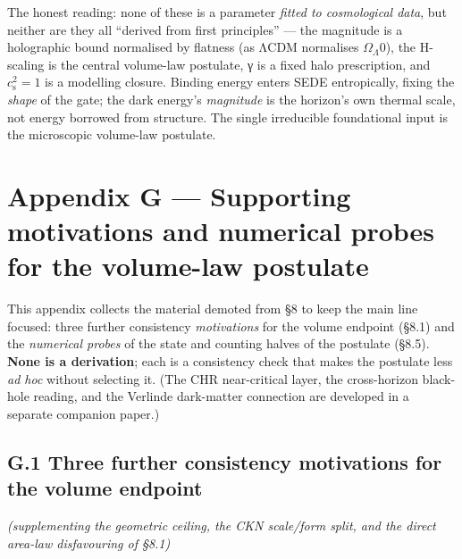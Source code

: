 \documentclass[
  10pt,
]{article}
\begin{document}
The honest reading: none of these is a parameter \emph{fitted to
cosmological data}, but neither are they all ``derived from first
principles'' --- the magnitude is a holographic bound normalised by
flatness (as ΛCDM normalises \(\Omega _\Lambda 0\)), the H-scaling is
the central volume-law postulate, γ is a fixed halo prescription, and
\(c_{\mathrm{s}}^{2} = 1\) is a modelling closure. Binding energy enters
SEDE entropically, fixing the \emph{shape} of the gate; the dark
energy's \emph{magnitude} is the horizon's own thermal scale, not energy
borrowed from structure. The single irreducible foundational input is
the microscopic volume-law postulate.

\section{Appendix G --- Supporting motivations and numerical probes for
the volume-law
postulate}\label{appendix-g-supporting-motivations-and-numerical-probes-for-the-volume-law-postulate}

This appendix collects the material demoted from §8 to keep the main
line focused: three further consistency \emph{motivations} for the
volume endpoint (§8.1) and the \emph{numerical probes} of the state and
counting halves of the postulate (§8.5). \textbf{None is a derivation};
each is a consistency check that makes the postulate less \emph{ad hoc}
without selecting it. (The CHR near-critical layer, the cross-horizon
black-hole reading, and the Verlinde dark-matter connection are
developed in a separate companion paper.)

\subsection{G.1 Three further consistency motivations for the volume
endpoint}\label{g.1-three-further-consistency-motivations-for-the-volume-endpoint}

\emph{(supplementing the geometric ceiling, the CKN scale/form split,
and the direct area-law disfavouring of §8.1)}
\end{document}
